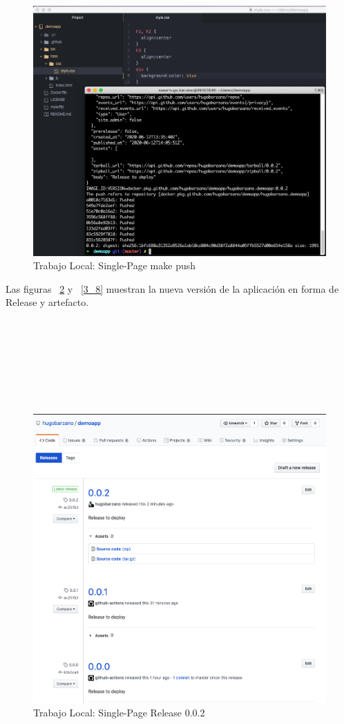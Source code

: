 \documentclass[a4paper,11pt]{book}
\begin{document}
\begin{figure}[H]
\centering
\includegraphics[scale=0.4]{imagenes/casouso_a/3_6.png}
\caption{ Trabajo Local: Single-Page make push  }
\label{3_6}
\end{figure}

Las figuras ~\ref{3_7} y ~\ref{3_8} muestran la nueva versión de la aplicación en forma de Release y artefacto. 
~\\
~\\
~\\
~\\
~\\
~\\
~\\
~\\
   \begin{figure}[H]
\centering
\includegraphics[scale=0.3]{imagenes/casouso_a/3_7.png}
\caption{  Trabajo Local: Single-Page Release 0.0.2 }
\label{3_7}
\end{figure}
\end{document}
